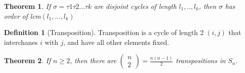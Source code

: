 \documentclass{article}
\theoremstyle{MyNonumberplain}
\theoremstyle{break}
\theoremstyle{break}
\newtheorem{theorem}{Theorem}[section]
\theoremstyle{break}
\theoremstyle{definition}
\theoremstyle{break}
\newtheorem{definition}{Definition}[section]
\begin{document}
\begin{thmbox}
    \begin{theorem}
        If $\sigma=\tau1\tau2...\tau k$ are disjoint cycles of length $l_1,..,l_k$, then $\sigma$ has order of lcm$(l_1,...,l_k)$
    \end{theorem}
\end{thmbox}

\begin{defbox}
    \begin{definition}[Transposition]
        Transposition is a cycle of length 2 $(i,j)$ that interchanes $i$ with $j$, and have all other elements fixed. 
    \end{definition}
\end{defbox}


\begin{thmbox}
    \begin{theorem}
        If $n\geq 2$, then there are $\left(\begin{array}{c}n\\2\end{array}\right)=\frac{n(n-1)}{2}$ transpositions in $S_n$. 
    \end{theorem}
\end{thmbox}
\end{document}
